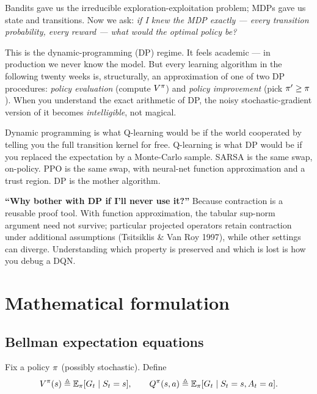 \documentclass[11pt,oneside]{scrbook}
\begin{document}
%
Bandits gave us the irreducible exploration-exploitation problem; MDPs gave us
state and transitions. Now we ask: \emph{if I knew the MDP exactly --- every
transition probability, every reward --- what would the optimal policy be?}

This is the dynamic-programming (DP) regime. It feels academic --- in
production we never know the model. But every learning algorithm in the
following twenty weeks is, structurally, an approximation of one of two DP
procedures: \emph{policy evaluation} (compute $V^\pi$) and \emph{policy
improvement} (pick $\pi' \ge \pi$). When you understand the exact
arithmetic of DP, the noisy stochastic-gradient version of it becomes
\emph{intelligible}, not magical.

\begin{intuition}
Dynamic programming is what Q-learning would be if the world cooperated by
telling you the full transition kernel for free. Q-learning is what DP would be
if you replaced the expectation by a Monte-Carlo sample. SARSA is the same
swap, on-policy. PPO is the same swap, with neural-net function approximation
and a trust region. DP is the mother algorithm.
\end{intuition}

\begin{pitfall}
\textbf{``Why bother with DP if I'll never use it?''} Because contraction is a reusable proof tool. With function
approximation, the tabular sup-norm argument need not survive; particular
projected operators retain contraction under additional assumptions
(Tsitsiklis \& Van Roy 1997), while other settings can diverge. Understanding which
property is preserved and which is lost is how you debug a DQN.
\end{pitfall}

\chapter{Mathematical formulation}
\label{ch:math}

\section{Bellman expectation equations}

Fix a policy $\pi$ (possibly stochastic). Define
\[
V^\pi(s) \triangleq \mathbb{E}_\pi[G_t \mid S_t=s], \qquad
Q^\pi(s,a) \triangleq \mathbb{E}_\pi[G_t \mid S_t=s, A_t=a].
\]
\end{document}
